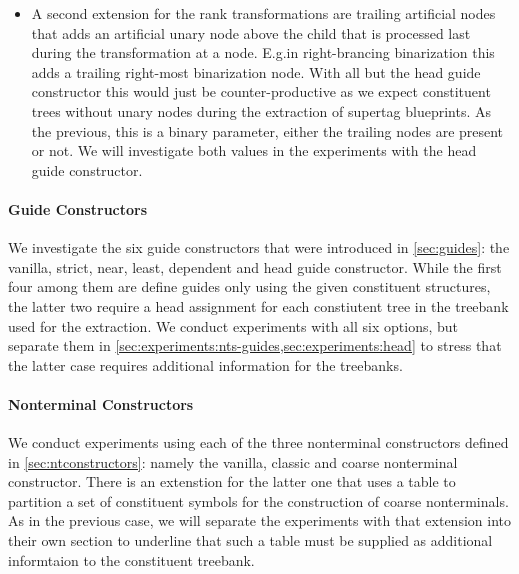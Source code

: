 \documentclass[../../document.tex]{subfiles}
\begin{document}
\begin{itemize}
        \item A second extension for the rank transformations are trailing artificial nodes that adds an artificial unary node above the child that is processed last during the transformation at a node. E.g.\@ in right-brancing binarization this adds a trailing right-most binarization node. With all but the head guide constructor this would just be counter-productive as we expect constituent trees without unary nodes during the extraction of supertag blueprints. As the previous, this is a binary parameter, either the trailing nodes are present or not. We will investigate both values in the experiments with the head guide constructor.
    \end{itemize}

    \paragraph*{Guide Constructors}
    We investigate the six guide constructors that were introduced in \cref{sec:guides}: the vanilla, strict, near, least, dependent and head guide constructor.
    While the first four among them are define guides only using the given constituent structures, the latter two require a head assignment for each constiutent tree in the treebank used for the extraction.
    We conduct experiments with all six options, but separate them in \cref{sec:experiments:nts-guides,sec:experiments:head} to stress that the latter case requires additional information for the treebanks.

    \paragraph*{Nonterminal Constructors}
    We conduct experiments using each of the three nonterminal constructors defined in \cref{sec:ntconstructors}: namely the vanilla, classic and coarse nonterminal constructor.
    There is an extenstion for the latter one that uses a table to partition a set of constituent symbols for the construction of coarse nonterminals.
    As in the previous case, we will separate the experiments with that extension into their own section to underline that such a table must be supplied as additional informtaion to the constituent treebank.
\end{document}
